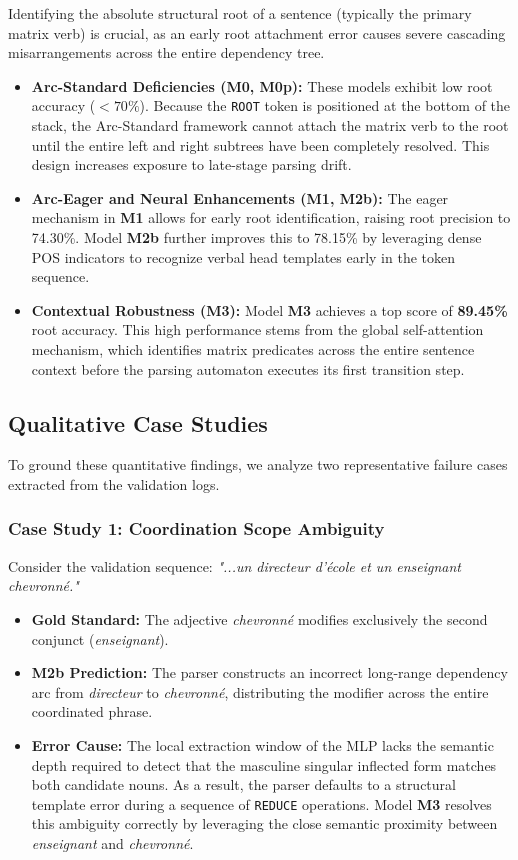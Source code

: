 \documentclass[12pt,a4paper]{article}
\begin{document}
Identifying the absolute structural root of a sentence (typically the primary matrix verb) is crucial, as an early root attachment error causes severe cascading misarrangements across the entire dependency tree.

\begin{itemize}
    \item \textbf{Arc-Standard Deficiencies (M0, M0p):} These models exhibit low root accuracy ($<70\%$). Because the \texttt{ROOT} token is positioned at the bottom of the stack, the Arc-Standard framework cannot attach the matrix verb to the root until the entire left and right subtrees have been completely resolved. This design increases exposure to late-stage parsing drift.
    \item \textbf{Arc-Eager and Neural Enhancements (M1, M2b):} The eager mechanism in \textbf{M1} allows for early root identification, raising root precision to 74.30\%. Model \textbf{M2b} further improves this to 78.15\% by leveraging dense POS indicators to recognize verbal head templates early in the token sequence.
    \item \textbf{Contextual Robustness (M3):} Model \textbf{M3} achieves a top score of \textbf{89.45\%} root accuracy. This high performance stems from the global self-attention mechanism, which identifies matrix predicates across the entire sentence context before the parsing automaton executes its first transition step.
\end{itemize}

\subsection{Qualitative Case Studies}
\label{subsec:qualitative_case_studies}

To ground these quantitative findings, we analyze two representative failure cases extracted from the validation logs.

\subsubsection{Case Study 1: Coordination Scope Ambiguity}
Consider the validation sequence: \textit{"...un directeur d'école et un enseignant chevronné."}
\begin{itemize}
    \item \textbf{Gold Standard:} The adjective \textit{chevronné} modifies exclusively the second conjunct (\textit{enseignant}).
    \item \textbf{M2b Prediction:} The parser constructs an incorrect long-range dependency arc from \textit{directeur} to \textit{chevronné}, distributing the modifier across the entire coordinated phrase.
    \item \textbf{Error Cause:} The local extraction window of the MLP lacks the semantic depth required to detect that the masculine singular inflected form matches both candidate nouns. As a result, the parser defaults to a structural template error during a sequence of \texttt{REDUCE} operations. Model \textbf{M3} resolves this ambiguity correctly by leveraging the close semantic proximity between \textit{enseignant} and \textit{chevronné}.
\end{itemize}
\end{document}
